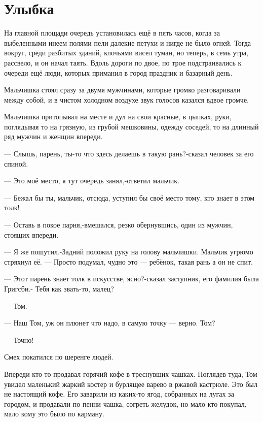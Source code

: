  
 
 
 
 

\section{Улыбка}
\label{sec:books.bredberi_rej.rasskazy.ulybka}

На главной площади очередь установилась ещё в пять часов, когда за выбеленными
инеем полями пели далекие петухи и нигде не было огней. Тогда вокруг, среди
разбитых зданий, клочьями висел туман, но теперь, в семь утра, рассвело, и он
начал таять. Вдоль дороги по двое, по трое подстраивались к очереди ещё люди,
которых приманил в город праздник и базарный день.

Мальчишка стоял сразу за двумя мужчинами, которые громко разговаривали между
собой, и в чистом холодном воздухе звук голосов казался вдвое громче.

Мальчишка притопывал на месте и дул на свои красные, в цыпках, руки, поглядывая
то на грязную, из грубой мешковины, одежду соседей, то на длинный ряд мужчин и
женщин впереди.

— Слышь, парень, ты-то что здесь делаешь в такую рань?-сказал человек за его
спиной.

— Это моё место, я тут очередь занял,-ответил мальчик.

— Бежал бы ты, мальчик, отсюда, уступил бы своё место тому, кто знает в этом
толк!

— Оставь в покое парня,-вмешался, резко обернувшись, один из мужчин, стоящих
впереди.

— Я же пошутил.-Задний положил руку на голову мальчишки. Мальчик угрюмо
стряхнул её. — Просто подумал, чудно это — ребёнок, такая рань а он не спит.

— Этот парень знает толк в искусстве, ясно?-сказал заступник, его фамилия была
Григсби.- Тебя как звать-то, малец?

— Том.

— Наш Том, уж он плюнет что надо, в самую точку — верно. Том?

— Точно!

Смех покатился по шеренге людей.

Впереди кто-то продавал горячий кофе в треснувших чашках. Поглядев туда, Том
увидел маленький жаркий костер и бурлящее варево в ржавой кастрюле. Это был не
настоящий кофе. Его заварили из каких-то ягод, собранных на лугах за городом, и
продавали по пенни чашка, согреть желудок, но мало кто покупал, мало кому это
было по карману.

